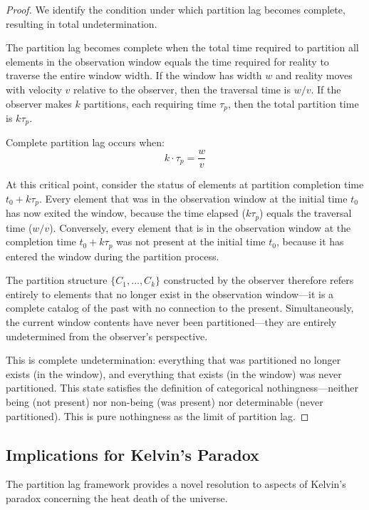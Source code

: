 \documentclass[12pt,a4paper]{article}
\theoremstyle{definition}
\theoremstyle{remark}
\begin{document}
\begin{proof}
We identify the condition under which partition lag becomes complete, resulting in total undetermination.

The partition lag becomes complete when the total time required to partition all elements in the observation window equals the time required for reality to traverse the entire window width. If the window has width $w$ and reality moves with velocity $v$ relative to the observer, then the traversal time is $w/v$. If the observer makes $k$ partitions, each requiring time $\tau_p$, then the total partition time is $k\tau_p$.

Complete partition lag occurs when:
\begin{equation}
k \cdot \tau_p = \frac{w}{v}
\end{equation}

At this critical point, consider the status of elements at partition completion time $t_0 + k\tau_p$. Every element that was in the observation window at the initial time $t_0$ has now exited the window, because the time elapsed ($k\tau_p$) equals the traversal time ($w/v$). Conversely, every element that is in the observation window at the completion time $t_0 + k\tau_p$ was not present at the initial time $t_0$, because it has entered the window during the partition process.

The partition structure $\{C_1, \ldots, C_k\}$ constructed by the observer therefore refers entirely to elements that no longer exist in the observation window—it is a complete catalog of the past with no connection to the present. Simultaneously, the current window contents have never been partitioned—they are entirely undetermined from the observer's perspective.

This is complete undetermination: everything that was partitioned no longer exists (in the window), and everything that exists (in the window) was never partitioned. This state satisfies the definition of categorical nothingness—neither being (not present) nor non-being (was present) nor determinable (never partitioned). This is pure nothingness as the limit of partition lag.
\end{proof}

\subsection{Implications for Kelvin's Paradox}

The partition lag framework provides a novel resolution to aspects of Kelvin's paradox concerning the heat death of the universe.
\end{document}

